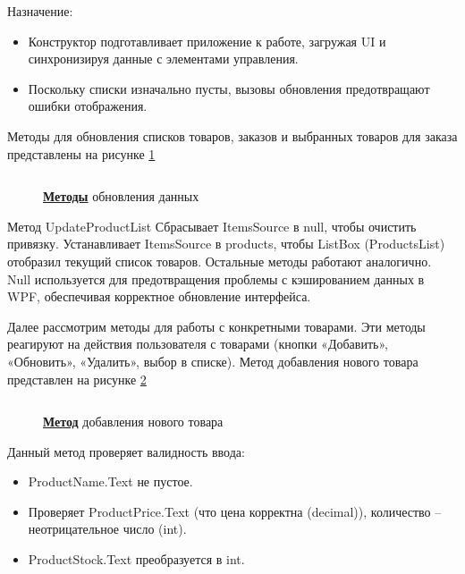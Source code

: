 \documentclass[12pt]{article}
\newcommand{\colorGIT}[1]{\textbf{#1}}
\renewcommand{\texttt}[1]{{\small\ttfamily #1}}
\numberwithin{listing}{section}
\numberwithin{figure}{section}
\begin{document}
\noindent Назначение:
\begin{itemize}
	\item Конструктор подготавливает приложение к работе, загружая \texttt{UI} и синхронизируя данные с элементами управления.
	\item Поскольку списки изначально пусты, вызовы обновления предотвращают ошибки отображения.
\end{itemize}

Методы для обновления списков товаров, заказов и выбранных товаров для заказа
представлены на рисунке \ref{fig:Method}

\begin{figure}[H]
	\centering
	\inputminted[firstline=32, lastline=51]{csharp}{../../3lab/StoreManager/MainWindow.xaml.cs}
	\caption{\colorGIT{\href{https://github.com/WebMasterIT/Csharp_Labs/blob=ec375afd16c0647b337cf3d8a79c8bef904fc1be/3lab/StoreManager/MainWindow.xaml.cs\#L32-L51}{Методы}} обновления данных}
	\label{fig:Method}
\end{figure}

Метод \texttt{UpdateProductList} Сбрасывает \texttt{ItemsSource} в \texttt{null}, чтобы очистить привязку. Устанавливает \texttt{ItemsSource} в \texttt{products}, чтобы \texttt{ListBox} (\texttt{ProductsList}) отобразил текущий список товаров. Остальные методы работают аналогично. \texttt{Null} используется для предотвращения проблемы с кэшированием данных в \texttt{WPF}, обеспечивая корректное обновление интерфейса.

{}

Далее рассмотрим методы для работы с конкретными товарами. Эти методы реагируют на действия пользователя с товарами (кнопки «Добавить», «Обновить», «Удалить», выбор в списке). Метод добавления нового товара представлен на рисунке \ref{fig:MethodAdd}

\begin{figure}[H]
	\centering
	\inputminted[firstline=53, lastline=80]{csharp}{../../3lab/StoreManager/MainWindow.xaml.cs}
	\caption{\colorGIT{\href{https://github.com/WebMasterIT/Csharp_Labs/blob=ec375afd16c0647b337cf3d8a79c8bef904fc1be/3lab/StoreManager/MainWindow.xaml.cs\#L53-L80}{Метод}} добавления нового товара}
	\label{fig:MethodAdd}
\end{figure}

\noindent Данный метод проверяет валидность ввода:
\begin{itemize}
	\item \texttt{ProductName.Text} не пустое.
	\item Проверяет \texttt{ProductPrice.Text} (что цена корректна (\texttt{decimal})), количество -- неотрицательное число (\texttt{int}).
	\item \texttt{ProductStock.Text} преобразуется в \texttt{int}.
\end{itemize}
\end{document}
